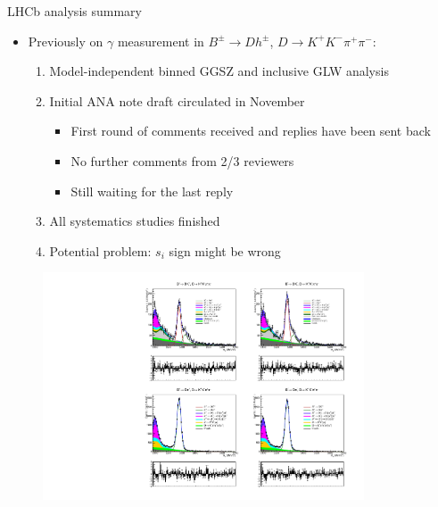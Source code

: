 \documentclass{beamer}
\begin{document}
\begin{frame}{LHCb analysis summary}
  \begin{itemize}
    \setlength\itemsep{0.5em}
    \item{Previously on $\gamma$ measurement in $B^\pm\to Dh^\pm$, $D\to K^+K^-\pi^+\pi^-$:}
    \begin{enumerate}
      \setlength\itemsep{0.5em}
      \item{Model-independent binned GGSZ and inclusive GLW analysis}
      \item{Initial ANA note draft circulated in November}
      \begin{itemize}
        \item{First round of comments received and replies have been sent back}
        \item{No further comments from 2/3 reviewers}
        \item{Still waiting for the last reply}
      \end{itemize}
      \item{All systematics studies finished}
      \item{Potential problem: $s_i$ sign might be wrong}
    \end{enumerate}
  \end{itemize}
  \begin{figure}
    \includegraphics[width = 0.85\textwidth, trim = {0 12.8cm 0 0}, clip]{Plots/d2kkpipi_fiveL_allDP_GLW.pdf}
  \end{figure}
\end{frame}
\end{document}
